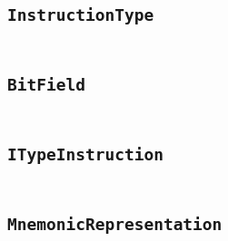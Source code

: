 \documentclass[a4paper]{article}
\begin{document}
\begin{appendix}
\begin{landscape}
    \section{\texttt{InstructionType}}\label{code:InstructionType}
    \begin{multicols}{2} %
    \inputminted[mathescape,
        linenos,
        numbersep=5pt,
        frame=none,
        framesep=2mm,
        fontsize=\footnotesize]{java}{../src/main/java/se/filipallberg/dark/mips32decompiler/instruction/type/InstructionType.java}
    \end{multicols}
    \end{landscape}
    


    \begin{landscape}
    \section{\texttt{BitField}}\label{code:BitField}
    \begin{multicols}{2} %
    \inputminted[mathescape,
        linenos,
        numbersep=5pt,
        frame=none,
        framesep=2mm,
        fontsize=\footnotesize]{java}{../src/main/java/se/filipallberg/dark/mips32decompiler/instruction/type/BitField.java}
    \end{multicols}
    \end{landscape}
    


    \begin{landscape}
    \section{\texttt{ITypeInstruction}}\label{code:ITypeInstruction}
    \begin{multicols}{2} %
    \inputminted[mathescape,
        linenos,
        numbersep=5pt,
        frame=none,
        framesep=2mm,
        fontsize=\footnotesize]{java}{../src/main/java/se/filipallberg/dark/mips32decompiler/instruction/type/ITypeInstruction/ITypeInstruction.java}
    \end{multicols}
    \end{landscape}
    


    \begin{landscape}
    \section{\texttt{MnemonicRepresentation}}\label{code:MnemonicRepresentation}
    \begin{multicols}{2} %
    \inputminted[mathescape,
        linenos,
        numbersep=5pt,
        frame=none,
        framesep=2mm,
        fontsize=\footnotesize]{java}{../src/main/java/se/filipallberg/dark/mips32decompiler/instruction/mnemonic/MnemonicRepresentation.java}
    \end{multicols}
    \end{landscape}
    



\end{appendix}
\end{document}
